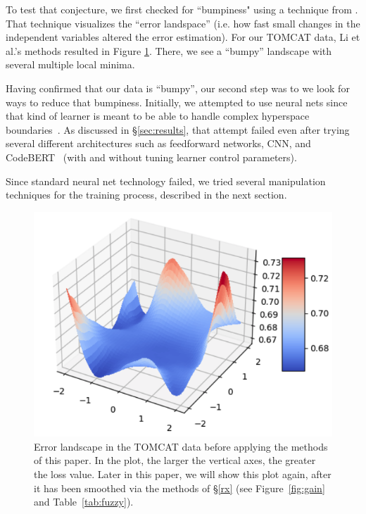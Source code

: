 To test that conjecture, we first    checked for ``bumpiness" using a technique
from \citet{li2018visualizing}. That technique
visualizes the ``error landspace'' 
(i.e. how fast small changes in the independent variables altered the error
estimation).
For our TOMCAT data, Li et al.'s methods resulted in Figure \ref{fig:loss}.
There, we see a ``bumpy'' landscape
with several multiple local minima. 

Having confirmed that our data is ``bumpy'', our second step was to
we look  for ways to reduce that bumpiness. Initially, we attempted to use
  neural nets since that kind of learner is meant
to be able to handle complex hyperspace boundaries~\cite{WittenFH11}.
As discussed in \S\ref{sec:results}, that attempt failed even after trying
several different architectures such 
as
feedforward networks, CNN,  and CodeBERT~\cite{rumelhart1986learning,habib2018many,vaswani2017attention}
(with and without tuning learner control parameters).

Since standard neural net technology failed, we tried several   manipulation techniques for the training process, described in the next section.  

\begin{figure}[!t]
   \begin{center}\includegraphics[width=.3\textwidth]{rahul/pre1.png} \end{center}
 
    \caption{Error landscape in the TOMCAT data    before    applying the methods of this paper. In the plot, the larger the vertical axes, the greater the loss value.
    Later in this paper,
    we will show this plot again, after it has been smoothed via the   methods of  \S\ref{rx}
    (see Figure~\ref{fig:gain} and Table~\ref{tab:fuzzy}).}
    \label{fig:loss}
\vspace{-10pt}
\end{figure}

